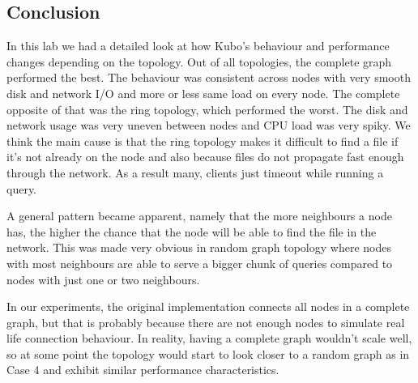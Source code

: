 



\subsection{Conclusion}

In this lab we had a detailed look at how Kubo's behaviour and performance
changes depending on the topology. Out of all topologies, the complete graph
performed the best. The behaviour was consistent across nodes with very smooth
disk and network I/O and more or less same load on every node. The complete
opposite of that was the ring topology, which performed the worst. The disk and
network usage was very uneven between nodes and CPU load was very spiky. We
think the main cause is that the ring topology makes it difficult to find a
file if it's not already on the node and also because files do not propagate
fast enough through the network. As a result many, clients just timeout while
running a query.

A general pattern became apparent, namely that the more neighbours a node has,
the higher the chance that the node will be able to find the file in the
network. This was made very obvious in random graph topology where nodes with
most neighbours are able to serve a bigger chunk of queries compared to nodes
with just one or two neighbours.

In our experiments, the original implementation connects all nodes in a
complete graph, but that is probably because there are not enough nodes to
simulate real life connection behaviour. In reality, having a complete graph
wouldn't scale well, so at some point the topology would start to look closer
to a random graph as in Case 4 and exhibit similar performance characteristics.



